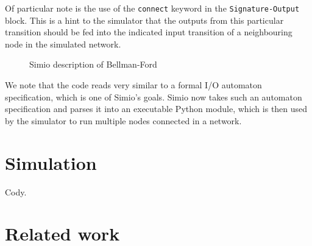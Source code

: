 \documentclass{scrartcl}
\def \kw#1{\texttt{\color{MidnightBlue}#1}}
\def \self {\texttt{\color{Cerulean}self}}
\def \py#1{\texttt{\color{LimeGreen}#1}}
\def \pyval#1{\texttt{\color{Sepia}#1}}
\begin{document}
Of particular note is the use of the \kw{connect} keyword in the
\kw{Signature-Output} block. This is a hint to the simulator that the outputs
from this particular transition should be fed into the indicated input
transition of a neighbouring node in the simulated network.

\begin{figure}
\caption{Simio description of Bellman-Ford}\label{alg:1}
\end{figure}

We note that the code reads very similar to a formal I/O automaton
specification, which is one of Simio's goals. Simio now takes such an automaton
specification and parses it into an executable Python module, which is then
used by the simulator to run multiple nodes connected in a network.

\section{Simulation}\label{sec:sim}

Cody.

\section{Related work}
\end{document}
